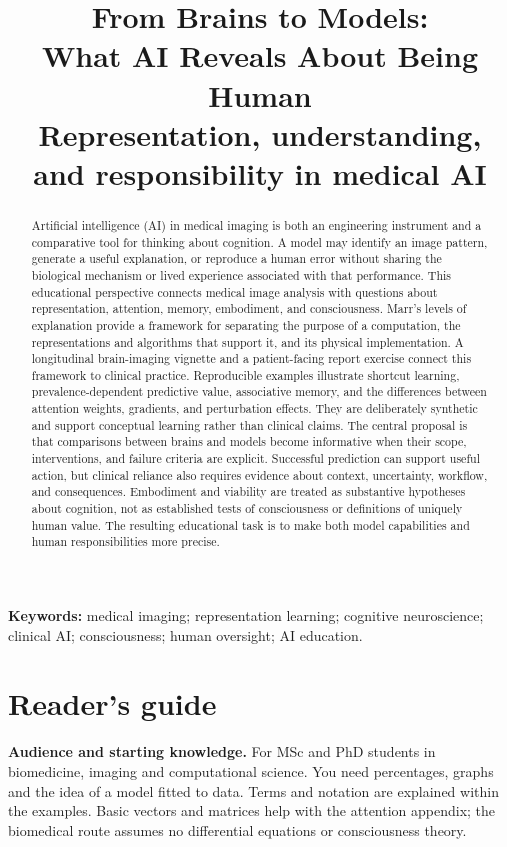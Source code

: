 \documentclass[11pt,a4paper]{article}
\title{\textbf{From Brains to Models:\\What AI Reveals About Being Human}\\[5mm]\large Representation, understanding, and responsibility in medical AI}
\author{\courseauthor}
\date{\coursedate}
\begin{document}
\maketitle
\begin{abstract}
Artificial intelligence (AI) in medical imaging is both an engineering instrument and a comparative tool for thinking about cognition. A model may identify an image pattern, generate a useful explanation, or reproduce a human error without sharing the biological mechanism or lived experience associated with that performance. This educational perspective connects medical image analysis with questions about representation, attention, memory, embodiment, and consciousness. Marr's levels of explanation provide a framework for separating the purpose of a computation, the representations and algorithms that support it, and its physical implementation. A longitudinal brain-imaging vignette and a patient-facing report exercise connect this framework to clinical practice. Reproducible examples illustrate shortcut learning, prevalence-dependent predictive value, associative memory, and the differences between attention weights, gradients, and perturbation effects. They are deliberately synthetic and support conceptual learning rather than clinical claims. The central proposal is that comparisons between brains and models become informative when their scope, interventions, and failure criteria are explicit. Successful prediction can support useful action, but clinical reliance also requires evidence about context, uncertainty, workflow, and consequences. Embodiment and viability are treated as substantive hypotheses about cognition, not as established tests of consciousness or definitions of uniquely human value. The resulting educational task is to make both model capabilities and human responsibilities more precise.
\end{abstract}
\textbf{Keywords:} medical imaging; representation learning; cognitive neuroscience; clinical AI; consciousness; human oversight; AI education.

\clearpage
\begingroup\small
\section*{Reader's guide}
\textbf{Audience and starting knowledge.} For MSc and PhD students in biomedicine, imaging and computational science. You need percentages, graphs and the idea of a model fitted to data. Terms and notation are explained within the examples. Basic vectors and matrices help with the attention appendix; the biomedical route assumes no differential equations or consciousness theory.
\end{document}
